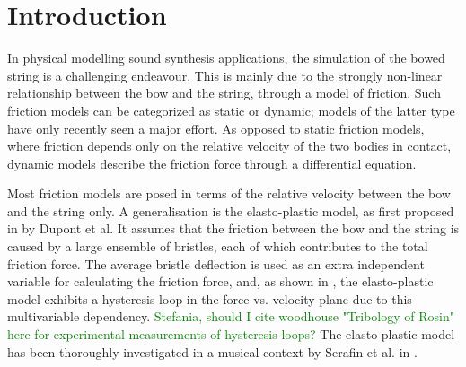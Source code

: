 \documentclass[twoside,a4paper,dvipsnames]{article}
\title{\papertitle}
\newif\ifpdf
\def\SWcomment[#1]{\textcolor{Green}{#1}}
\begin{document}
\ifpdf %
  \DeclareGraphicsExtensions{.png,.jpg,.pdf, .eps} 
\else  %
\fi

\maketitle
    
\begin{abstract}
The simulation of a bowed string is challenging due to the strongly non-linear relationship between the bow and the string. This relationship can be described through a model of friction. Several friction models in the literature have been proposed, from simple velocity dependent to more accurate ones. Similarly, a highly accurate technique to simulate a stiff string is the use of finite-difference time-domain (FDTD) methods. As these models are generally computationally heavy, implementation in real-time is challenging. \SWcomment[<- better like this?]{} This paper presents a real-time implementation of the \SWcomment[novel]{} combination of a complex friction model, namely the elasto-plastic friction model, and the stiff string simulated using FDTD methods. We show that it is possible to keep the CPU usage of a single bowed string below 5 percent. For real-time control of the bowed string, the Sensel Morph is used. 
\end{abstract}
\section{Introduction}
\label{sec:intro}
In physical modelling sound synthesis applications, the simulation of the bowed string is a challenging endeavour. This is mainly due to the strongly non-linear relationship between the bow and the string, through a model of friction. Such friction models can be categorized as static or dynamic; models of the latter type have only recently seen a major effort. As opposed to static friction models, where friction depends only on the relative velocity of the two bodies in contact, dynamic models describe the friction force through a differential equation.

Most friction models are posed in terms of the relative velocity between the bow and the string only. A generalisation is the elasto-plastic model, as first proposed in \cite{Dupont2002} by Dupont et al. It assumes that the friction between the bow and the string is caused by a large ensemble of bristles, each of which contributes to the total friction force. The average bristle deflection is used as an extra independent variable for calculating the friction force, and, as shown in \cite{Serafin2003}, the elasto-plastic model exhibits a hysteresis loop in the force vs. velocity plane due to this multivariable dependency. \SWcomment[Stefania, should I cite woodhouse "Tribology of Rosin" here for experimental measurements of hysteresis loops?]{} The elasto-plastic model has been thoroughly investigated in a musical context by Serafin et al. in \cite{Serafin2003, Serafin2004, Avanzini2005}. 
\end{document}
